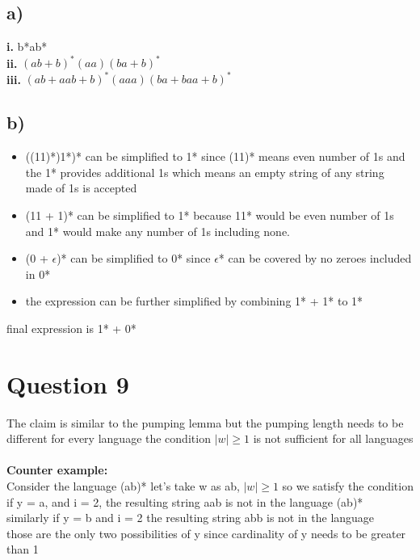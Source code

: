 \documentclass[11pt]{article}
\begin{document}
\subsection*{a)}
\textbf{i.} b*ab* \\
%
\textbf{ii.}
$(ab + b)^*
(aa)
(ba + b)^*$ \\
%
\textbf{iii.}
$(ab + aab + b)^*
(aaa)
(ba + baa + b)^*$ \\

\subsection*{b)}
\begin{itemize}
    \item ((11)*)1*)* can be simplified to 1* since (11)* means even number of
          1s and the 1* provides additional 1s which means an empty string
          of any string made of 1s is accepted
    \item (11 + 1)* can be simplified to 1* because 11* would be even number of
        1s and 1* would make any number of 1s including none.
    \item (0 + $\epsilon$)* can be simplified to 0* since $\epsilon$* can be
        covered by no zeroes included in 0*
    \item the expression can be further simplified by combining 1* + 1* to 1*
\end{itemize}
final expression is 1* + 0*

\section*{Question 9}
The claim is similar to the pumping lemma but the pumping length needs to be
different for every language the condition $|w| \ge 1$ is not sufficient for
all languages \\
\\
\textbf{Counter example:} \\
Consider the language (ab)* let's take w as ab, $|w| \ge 1$ so we satisfy the condition \\
if y = a, and i = 2, the resulting string aab is not in the language (ab)* \\
similarly if y = b and i = 2 the resulting string abb is not in the language \\
those are the only two possibilities of y since cardinality of y needs to be greater than 1 \\
\end{document}
